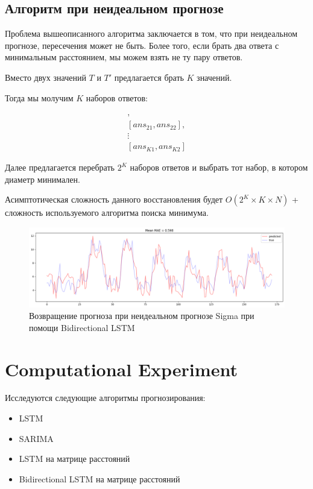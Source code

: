 \documentclass{article}
\begin{document}
\subsection{Алгоритм при неидеальном прогнозе}

Проблема вышеописанного алгоритма заключается в том, что при неидеальном прогнозе, пересечения может не быть. Более того, если брать два ответа с минимальным расстоянием, мы можем взять не ту пару ответов.

Вместо двух значений  $T$ и $T'$ предлагается брать $K$ значений.

Тогда мы молучим $K$ наборов ответов:

\begin{gather*}
	[ans_{11}, ans_{12}],\\
	[ans_{21}, ans_{22}],\\
	\vdots \\
	[ans_{K1}, ans_{K2}]
\end{gather*}

Далее предлагается перебрать $2^K$ наборов ответов и выбрать тот набор, в котором диаметр минимален.

Асимптотическая сложность данного восстановления будет $O(2^K \times K \times N)$ + сложность используемого алгоритма поиска минимума.

\begin{figure}[H]
	\centering
	\includegraphics[width=\textwidth]{TbiLSTM.png}
	\caption{Возвращение прогноза при неидеальном прогнозе Sigma при помощи Bidirectional LSTM}
	\label{fig:fig4}
\end{figure}

\section{Computational Experiment}

Исследуются следующие алгоритмы прогнозирования:

\begin{itemize}
	\item LSTM \cite{LSTM}
	\item SARIMA \cite{ARIMAvsLSTM}
	\item LSTM на матрице расстояний
	\item Bidirectional LSTM на матрице расстояний
\end{itemize}
\end{document}

